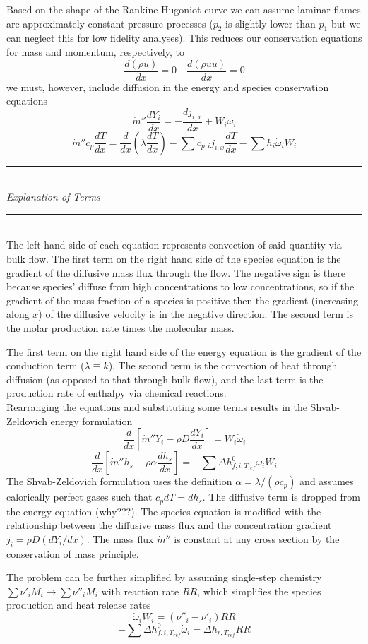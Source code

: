 \documentclass[11pt]{article}
\newcommand{\Header}[1]{\noindent\rule{\textwidth}{0.4pt}\\[0.3cm]\indent \large{\textit{#1}}\normalsize{}\\[-0.1cm]\noindent\rule{\textwidth}{0.4pt}}
\begin{document}
Based on the shape of the Rankine-Hugoniot curve we can assume laminar flames are approximately constant pressure processes ($p_2$ is slightly lower than $p_1$ but we can neglect this for low fidelity analyses). This reduces our conservation equations for mass and momentum, respectively, to
$$\frac{d(\rho u)}{dx} = 0\quad \frac{d(\rho u u)}{dx} = 0$$
we must, however, include diffusion in the energy and species conservation equations
$$\dot m''\frac{dY_i}{dx} = -\frac{dj_{i,x}}{dx} + W_i\dot\omega_i$$
$$\dot m''c_p\frac{dT}{dx} = \frac{d}{dx}\left(\lambda\frac{dT}{dx}\right) - \sum c_{p,i}j_{i,x}\frac{dT}{dx} - \sum h_i\dot\omega_iW_i$$

\Header{Explanation of Terms}\\

The left hand side of each equation represents convection of said quantity via bulk flow. The first term on the right hand side of the species equation is the gradient of the diffusive mass flux through the flow. The negative sign is there because species' diffuse from high concentrations to low concentrations, so if the gradient of the mass fraction of a species is positive then the gradient (increasing along $x$) of the diffusive velocity is in the negative direction. The second term is the molar production rate times the molecular mass.

The first term on the right hand side of the energy equation is the gradient of the conduction term ($\lambda\equiv k$). The second term is the convection of heat through diffusion (as opposed to that through bulk flow), and the last term is the production rate of enthalpy via chemical reactions.\\

Rearranging the equations and substituting some terms results in the Shvab-Zeldovich energy formulation
$$\frac{d}{dx}\left[\dot m''Y_i - \rho D\frac{dY_i}{dx}\right] = W_i\dot\omega_i$$
$$\frac{d}{dx}\left[\dot m''h_s -\rho\alpha\frac{dh_s}{dx}\right] = -\sum\Delta h_{f,i,T_{ref}}^0 \dot\omega_iW_i$$
The Shvab-Zeldovich formulation uses the definition $\alpha = \lambda/(\rho c_p)$ and assumes calorically perfect gases such that $c_pdT = dh_s$. The diffusive term is dropped from the energy equation (why???). The species equation is modified with the relationship between the diffusive mass flux and the concentration gradient $j_i = \rho D(dY_i/dx)$. The mass flux $\dot m''$ is constant at any cross section by the conservation of mass principle.

The problem can be further simplified by assuming single-step chemistry $\sum\nu'_iM_i\to\sum\nu''_iM_i$ with reaction rate $RR$, which simplifies the species production and heat release rates
$$\dot\omega_iW_i = (\nu''_i-\nu'_i)RR$$
$$-\sum\Delta h_{f,i,T_{ref}}^0\dot\omega_i = \Delta h_{r,T_{ref}}RR$$
\end{document}
